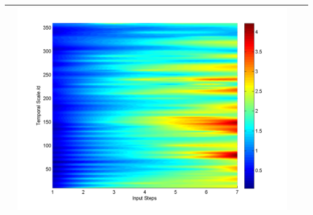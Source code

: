 \documentclass[11pt]{article}
\begin{document}
\begin{table}[H]
{\begin{tabular}{c  c   c   c  }
&\begin{minipage}{.3\textwidth}\includegraphics[width=\linewidth]{resultgraph/14359000pepq.png}\end{minipage}
\\
 
\bottomrule
\end{tabular}
}
\end{table}
\end{document}
